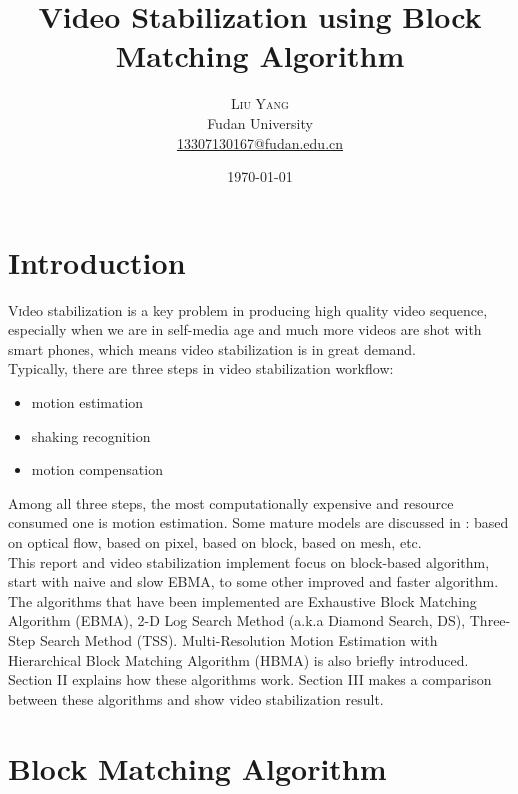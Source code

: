 \documentclass[a4paper, twocolumn]{article}
\title{Video Stabilization using Block Matching Algorithm} %
\author{%
	\textsc{Liu Yang} \\[1ex] %
	\normalsize Fudan University \\ %
	\normalsize \href{mailto:13307130167@fudan.edu.cn}{13307130167@fudan.edu.cn} %
}
\date{\today} %
\begin{document}
	
	\maketitle
	
	\section{Introduction}
	
	\lettrine[nindent=0em,lines=3]{V} ideo stabilization is a key problem in producing high quality video sequence, especially when we are in self-media age and much more videos are shot with smart phones, which means video stabilization is in great demand. \\
	Typically, there are three steps in video stabilization workflow: 
	
	\begin{itemize}
		\item motion estimation
		\item shaking recognition
		\item motion compensation
	\end{itemize}
	\noindent
	Among all three steps, the most computationally expensive and resource consumed one is motion estimation. Some mature models are discussed in \cite{vpc}: based on optical flow, based on pixel, based on block, based on mesh, etc. \\
	This report and video stabilization implement focus on block-based algorithm, start with naive and slow EBMA, to some other improved and faster algorithm. The algorithms that have been implemented are Exhaustive Block Matching Algorithm (EBMA), 2-D Log Search Method (a.k.a Diamond Search, DS), Three-Step Search Method (TSS). Multi-Resolution Motion Estimation with Hierarchical Block Matching Algorithm (HBMA) is also briefly introduced. Section II explains how these algorithms work. Section III makes a comparison between these algorithms and show video stabilization result. 
	
	
	\section{Block Matching Algorithm}
	
\end{document}
